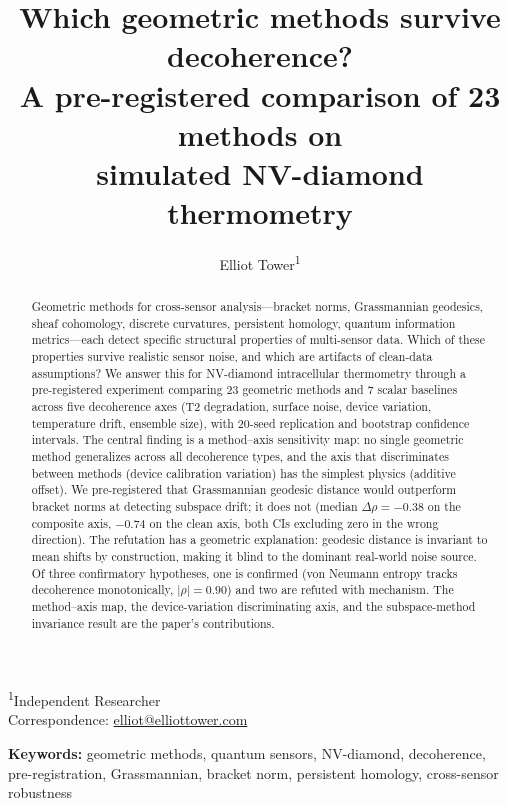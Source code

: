 \documentclass[11pt]{article}
\title{Which geometric methods survive decoherence?\\
  A pre-registered comparison of 23 methods on\\
  simulated NV-diamond thermometry}
\author{Elliot Tower\textsuperscript{1}}
\date{}
\begin{document}
\maketitle

\noindent\textsuperscript{1}Independent Researcher\\
\noindent Correspondence: \href{mailto:elliot@elliottower.com}{elliot@elliottower.com}

\bigskip

\begin{abstract}
Geometric methods for cross-sensor analysis---bracket norms, Grassmannian
geodesics, sheaf cohomology, discrete curvatures, persistent homology,
quantum information metrics---each detect specific structural properties
of multi-sensor data.  Which of these properties survive realistic
sensor noise, and which are artifacts of clean-data assumptions?  We
answer this for NV-diamond intracellular thermometry through a
pre-registered experiment comparing 23 geometric methods and 7 scalar
baselines across five decoherence axes (T2 degradation, surface noise,
device variation, temperature drift, ensemble size), with 20-seed
replication and bootstrap confidence intervals.  The central finding is
a method--axis sensitivity map: no single geometric method generalizes
across all decoherence types, and the axis that discriminates between
methods (device calibration variation) has the simplest physics
(additive offset).  We pre-registered that Grassmannian geodesic
distance would outperform bracket norms at detecting subspace drift;
it does not (median $\Delta\rho = -0.38$ on the composite axis,
$-0.74$ on the clean axis, both CIs excluding zero in the wrong
direction).  The refutation has a geometric explanation: geodesic
distance is invariant to mean shifts by construction, making it blind
to the dominant real-world noise source.  Of three confirmatory
hypotheses, one is confirmed (von Neumann entropy tracks decoherence
monotonically, $|\rho| = 0.90$) and two are refuted with mechanism.
The method--axis map, the device-variation discriminating axis, and the
subspace-method invariance result are the paper's contributions.
\end{abstract}

\noindent\textbf{Keywords:}
geometric methods, quantum sensors, NV-diamond, decoherence,
pre-registration, Grassmannian, bracket norm, persistent homology,
cross-sensor robustness

\end{document}
